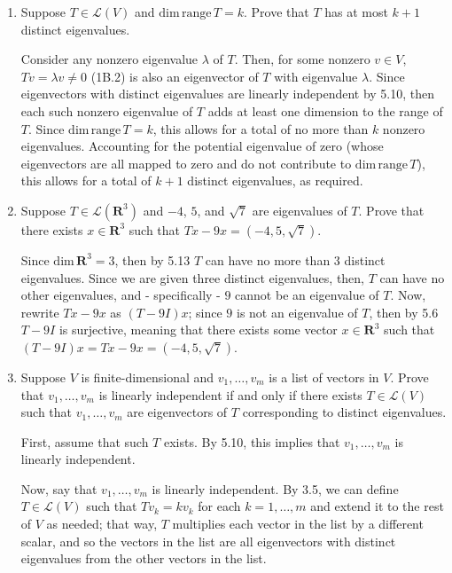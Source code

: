 \documentclass{book}
\begin{document}
\begin{enumerate}
\item Suppose \(T \in \mathcal{L}(V)\) and \(\textrm{dim} \, \textrm{range} \, T = k\).  Prove that \(T\) has at most \(k+1\) distinct eigenvalues.

Consider any nonzero eigenvalue \(\lambda\) of \(T\).  Then, for some nonzero \(v \in V\), \(Tv=\lambda v \neq 0\) (1B.2) is also an eigenvector of \(T\) with eigenvalue \(\lambda\).  Since eigenvectors with distinct eigenvalues are linearly independent by 5.10, then each such nonzero eigenvalue of \(T\) adds at least one dimension to the range of \(T\).  Since \(\text{dim} \, \text{range} \, T = k\), this allows for a total of no more than \(k\) nonzero eigenvalues.  Accounting for the potential eigenvalue of zero (whose eigenvectors are all mapped to zero and do not contribute to \(\text{dim} \, \textrm{range} \, T\)), this allows for a total of \(k+1\) distinct eigenvalues, as required.

\item Suppose \(T \in \mathcal{L}(\textbf{R}^3)\) and \(-4\), \(5\), and \(\sqrt{7}\) are eigenvalues of \(T\).  Prove that there exists \(x \in \textbf{R}^3\) such that \(Tx-9x=(-4,5,\sqrt{7})\).

Since \(\textrm{dim} \, \textbf{R}^3=3\), then by 5.13 \(T\) can have no more than \(3\) distinct eigenvalues.  Since we are given three distinct eigenvalues, then, \(T\) can have no other eigenvalues, and - specifically - \(9\) cannot be an eigenvalue of \(T\).  Now, rewrite \(Tx-9x\) as \((T-9I)x\); since \(9\) is not an eigenvalue of \(T\), then by 5.6 \(T-9I\) is surjective, meaning that there exists some vector \(x \in \textbf{R}^3\) such that \((T-9I)x=Tx-9x=(-4,5,\sqrt{7})\).

\item Suppose \(V\) is finite-dimensional and \(v_1,\dots,v_m\) is a list of vectors in \(V\).  Prove that \(v_1,\dots,v_m\) is linearly independent if and only if there exists \(T \in \mathcal{L}(V)\) such that \(v_1,\dots,v_m\) are eigenvectors of \(T\) corresponding to distinct eigenvalues.

First, assume that such \(T\) exists.  By 5.10, this implies that \(v_1,\dots,v_m\) is linearly independent.

Now, say that \(v_1,\dots,v_m\) is linearly independent.  By 3.5, we can define \(T \in \mathcal{L}(V)\) such that \(Tv_k=kv_k\) for each \(k=1,\dots,m\) and extend it to the rest of \(V\) as needed; that way, \(T\) multiplies each vector in the list by a different scalar, and so the vectors in the list are all eigenvectors with distinct eigenvalues from the other vectors in the list.


\end{enumerate}
\end{document}

